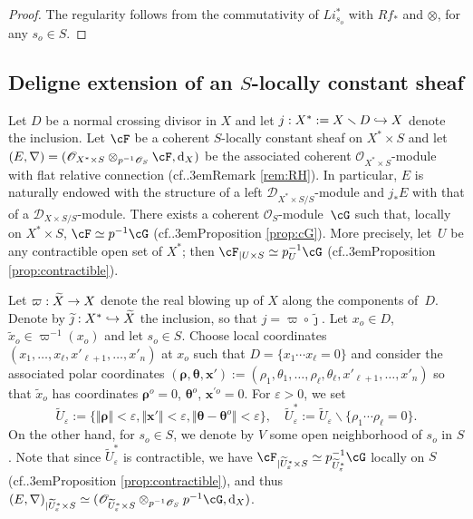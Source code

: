 \documentclass[english]{smfart}
\numberwithin{subsection}{section}
\def\shd{\mathcal{D}}\let\cD\shd
\def\sho{\mathcal{O}}\let\cO\sho
\newcommand{\rd}{\mathrm{d}}
\newcommand{\rhog}{\boldsymbol{\rho}}
\renewcommand{\thetag}{\boldsymbol{\theta}}
\newcommand{\XS}{X\times S}
\newcommand{\XsS}{X^*\times S}
\newcommand{\US}{U\times S}
\newcommand{\DXS}{\shd_{\XS/S}}
\let\wt\widetilde
\let\epsilon\varepsilon
\def\cf{cf.\kern.3em}
\let\moins\smallsetminus
\def\wtj{\wt\jmath}
\newcommand{\pOS}{p^{-1}\sho_S}
\numberwithin{equation}{section}
\theoremstyle{plain}
\theoremstyle{definition}
\def\to{\mathchoice{\longrightarrow}{\rightarrow}{\rightarrow}{\rightarrow}}
\def\hto{\mathrel{\lhook\joinrel\to}}
\begin{document}
\begin{proof}
The regularity follows from the commutativity of $Li^*_{s_o}$ with $R f_*$ and $\otimes$, for any $s_o\in S$.
\end{proof}

\subsection{Deligne extension of an $S$-locally constant sheaf}\label{subsec:Deligneextension}

Let $D$ be a normal crossing divisor in $X$ and let $j:X^*:=X\moins D\hto X$ denote the inclusion. Let $\cF$ be a coherent $S$-locally constant sheaf on $\XsS$ and let $(E,\nabla)=(\cO_{\XsS}\otimes_{\pOS}\nobreak\cF,\rd_X)$ be the associated coherent $\cO_{\XsS}$-module with flat relative connection (\cf Remark \ref{rem:RH}). In particular, $E$ is naturally endowed with the structure of a left $\cD_{\XsS/S}$-module and $j_*E$ with that of a $\DXS$-module. There exists a coherent $\sho_S$-module~$\cG$ such that, locally on $\XsS$, $\cF\simeq p^{-1}\cG$ (\cf Proposition \ref{prop:cG}). More precisely, let~$U$ be any contractible open set of $X^*$; then $\cF_{|\US}\simeq p_U^{-1}\cG$ (\cf Proposition \ref{prop:contractible}).

Let $\varpi:\wt X\to X$ denote the real blowing up of $X$ along the components of~$D$. Denote by $\wtj:X^*\hto\wt X$ the inclusion, so that $j=\varpi\circ\wtj$. Let $x_o\in D$, $\wt x_o\in\varpi^{-1}(x_o)$ and let $s_o\in S$. Choose local coordinates $(x_1,\dots,x_\ell,x'_{\ell+1},\dots,x'_n)$ at $x_o$ such that $D=\{x_1\cdots x_\ell=0\}$ and consider the associated polar coordinates $(\rhog,\thetag,\boldsymbol{x}'):=(\rho_1,\theta_1,\dots,\rho_\ell,\theta_\ell,x'_{\ell+1},\dots,x'_n)$ so that $\wt x_o$ has coordinates $\rhog^o=0$, $\thetag^o$, $\boldsymbol{x}^{\prime o}=0$. For $\epsilon>0$, we set
\[
\wt U_\epsilon:=\{\Vert\rhog\Vert<\epsilon,\Vert\boldsymbol{x}'\Vert<\epsilon,\Vert\thetag-\thetag^o\Vert<\epsilon\},\quad \wt U^*_\epsilon:=\wt U_\epsilon\moins\{\rho_1\cdots\rho_\ell=0\}.
\]
On the other hand, for $s_o\in S$, we denote by $V$ some open neighborhood of $s_o$ in $S$. Note that since $\wt U^*_\epsilon$ is contractible, we have $\cF_{|\wt U^*_\epsilon\times S}\simeq p^{-1}_{\wt U^*_\epsilon}\cG$ locally on $S$ (\cf Proposition \ref{prop:contractible}), and thus $(E,\nabla)_{|\wt U^*_\epsilon\times S}\simeq (\cO_{\wt U^*_\epsilon\times S}\otimes_{\pOS}p^{-1}\cG,\rd_X)$.
\end{document}
